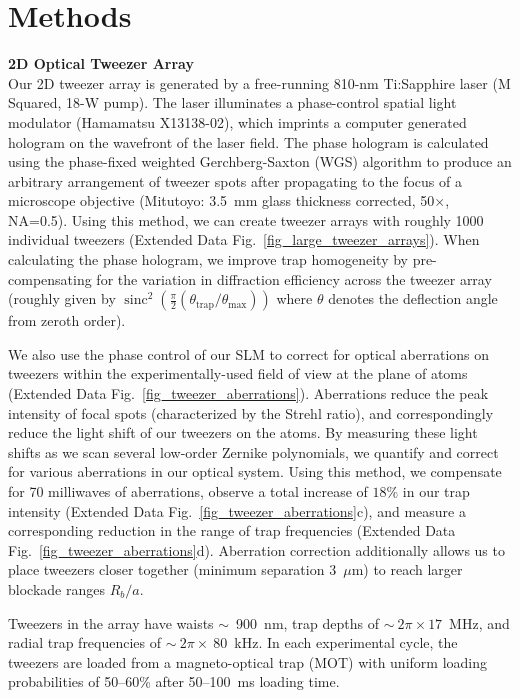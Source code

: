 \documentclass[reprint,twocolumn,secnumarabic,amssymb, aps, prl]{revtex4-1}
\DeclareMathOperator{\sinc}{sinc}
\begin{document}
\vfill\null

\section{Methods}
\noindent\textbf{2D Optical Tweezer Array}\\
Our 2D tweezer array is generated by a free-running 810-nm Ti:Sapphire laser (M Squared, 18-W pump). The laser illuminates a phase-control spatial light modulator (Hamamatsu X13138-02), which imprints a computer generated hologram on the wavefront of the laser field. The phase hologram is calculated using the phase-fixed weighted Gerchberg-Saxton (WGS) algorithm \cite{Kim:19} to produce an arbitrary arrangement of tweezer spots after propagating to the focus of a microscope objective (Mitutoyo: 3.5~mm glass thickness corrected, 50$\times$, NA=0.5). Using this method, we can create tweezer arrays with roughly 1000 individual tweezers (Extended Data Fig.~\ref{fig_large_tweezer_arrays}). When calculating the phase hologram, we improve trap homogeneity by pre-compensating for the variation in diffraction efficiency across the tweezer array (roughly given by $\sinc^2 (\frac{\pi}{2}(\theta_\text{trap}/\theta_\text{max}))$ where $\theta$ denotes the deflection angle from zeroth order).

We also use the phase control of our SLM to correct for optical aberrations on tweezers within the experimentally-used field of view at the plane of atoms (Extended Data Fig.~\ref{fig_tweezer_aberrations}). Aberrations reduce the peak intensity of focal spots (characterized by the Strehl ratio), and correspondingly reduce the light shift of our tweezers on the atoms. By measuring these light shifts as we scan several low-order Zernike polynomials, we quantify and correct for various aberrations in our optical system. Using this method, we compensate for 70 milliwaves of aberrations, observe a total increase of $18\%$ in our trap intensity (Extended Data Fig.~\ref{fig_tweezer_aberrations}c), and measure a corresponding reduction in the range of trap frequencies (Extended Data Fig.~\ref{fig_tweezer_aberrations}d). Aberration correction additionally allows us to place tweezers closer together (minimum separation 3~$\mu$m) to reach larger blockade ranges $R_b/a$.

Tweezers in the array have waists $\sim$~900~nm, trap depths of $\sim~2\pi \times 17$~MHz, and radial trap frequencies of $\sim~2\pi \times ~80$~kHz. In each experimental cycle, the tweezers are loaded from a magneto-optical trap (MOT) with uniform loading probabilities of 50--60\% after 50--100~ms loading time.\\
\end{document}
